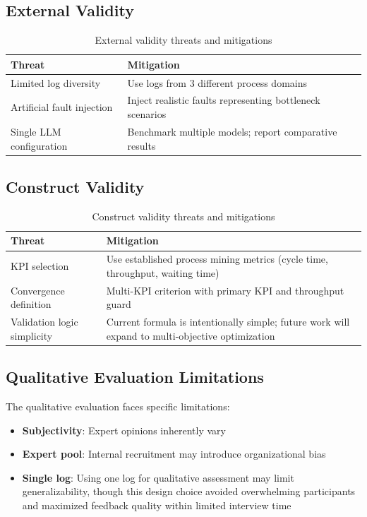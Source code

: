 \documentclass[preprint,12pt]{elsarticle}
\begin{document}
\subsection{External Validity}

\begin{table}[htbp]
\centering
\caption{External validity threats and mitigations}
\label{tab:external}
\begin{tabular}{@{}p{4cm}p{8cm}@{}}
\toprule
\textbf{Threat} & \textbf{Mitigation} \\
\midrule
Limited log diversity & Use logs from 3 different process domains \\
Artificial fault injection & Inject realistic faults representing bottleneck scenarios \\
Single LLM configuration & Benchmark multiple models; report comparative results \\
\bottomrule
\end{tabular}
\end{table}

\subsection{Construct Validity}

\begin{table}[htbp]
\centering
\caption{Construct validity threats and mitigations}
\label{tab:construct}
\begin{tabular}{@{}p{4cm}p{8cm}@{}}
\toprule
\textbf{Threat} & \textbf{Mitigation} \\
\midrule
KPI selection & Use established process mining metrics (cycle time, throughput, waiting time) \\
Convergence definition & Multi-KPI criterion with primary KPI and throughput guard \\
Validation logic simplicity & Current formula is intentionally simple; future work will expand to multi-objective optimization \\
\bottomrule
\end{tabular}
\end{table}

\subsection{Qualitative Evaluation Limitations}

The qualitative evaluation faces specific limitations:
\begin{itemize}
    \item \textbf{Subjectivity}: Expert opinions inherently vary
    \item \textbf{Expert pool}: Internal recruitment may introduce organizational bias
    \item \textbf{Single log}: Using one log for qualitative assessment may limit generalizability, though this design choice avoided overwhelming participants and maximized feedback quality within limited interview time
\end{itemize}
\end{document}
